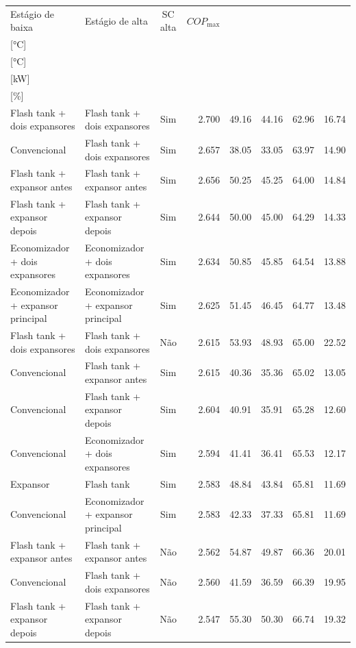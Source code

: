 {\small\setlength{\tabcolsep}{4pt}\renewcommand{\arraystretch}{1.12}
\begin{tabular}{llcrrrrr}
\toprule
Estágio de baixa & Estágio de alta & SC alta & $COP_{\max}$ & \shortstack{$T_{\mathrm{cond,l}}^*$\\{[°C]}} & \shortstack{$T_{\mathrm{evap,h}}^*$\\{[°C]}} & \shortstack{$\dot W_{\mathrm{liq}}$\\{[kW]}} & \shortstack{$\Delta COP_{\mathrm{opt}}$\\{[\%]}} \\
\midrule
Flash tank + dois expansores & Flash tank + dois expansores & Sim & 2.700 & 49.16 & 44.16 & 62.96 & 16.74 \\
Convencional & Flash tank + dois expansores & Sim & 2.657 & 38.05 & 33.05 & 63.97 & 14.90 \\
Flash tank + expansor antes & Flash tank + expansor antes & Sim & 2.656 & 50.25 & 45.25 & 64.00 & 14.84 \\
Flash tank + expansor depois & Flash tank + expansor depois & Sim & 2.644 & 50.00 & 45.00 & 64.29 & 14.33 \\
Economizador + dois expansores & Economizador + dois expansores & Sim & 2.634 & 50.85 & 45.85 & 64.54 & 13.88 \\
Economizador + expansor principal & Economizador + expansor principal & Sim & 2.625 & 51.45 & 46.45 & 64.77 & 13.48 \\
Flash tank + dois expansores & Flash tank + dois expansores & Não & 2.615 & 53.93 & 48.93 & 65.00 & 22.52 \\
Convencional & Flash tank + expansor antes & Sim & 2.615 & 40.36 & 35.36 & 65.02 & 13.05 \\
Convencional & Flash tank + expansor depois & Sim & 2.604 & 40.91 & 35.91 & 65.28 & 12.60 \\
Convencional & Economizador + dois expansores & Sim & 2.594 & 41.41 & 36.41 & 65.53 & 12.17 \\
Expansor & Flash tank & Sim & 2.583 & 48.84 & 43.84 & 65.81 & 11.69 \\
Convencional & Economizador + expansor principal & Sim & 2.583 & 42.33 & 37.33 & 65.81 & 11.69 \\
Flash tank + expansor antes & Flash tank + expansor antes & Não & 2.562 & 54.87 & 49.87 & 66.36 & 20.01 \\
Convencional & Flash tank + dois expansores & Não & 2.560 & 41.59 & 36.59 & 66.39 & 19.95 \\
Flash tank + expansor depois & Flash tank + expansor depois & Não & 2.547 & 55.30 & 50.30 & 66.74 & 19.32 \\

\end{tabular}}
